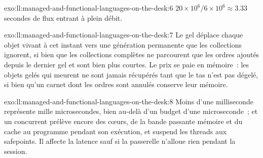 \begin{solution}{exo:ll:managed-and-functional-languages-on-the-desk:6}
$20 \times 10^6 / 6 \times 10^6 \approx 3.33$ secondes de flux entrant à plein débit.
\end{solution}

\begin{solution}{exo:ll:managed-and-functional-languages-on-the-desk:7}
Le gel déplace chaque objet vivant à cet instant vers une génération permanente que les collections ignorent, si bien que les collections complètes
ne parcourent que les ordres ajoutés depuis le dernier gel et sont bien plus courtes. Le prix se paie en mémoire~: les objets gelés qui meurent
ne sont jamais récupérés tant que le tas n'est pas dégelé, si bien qu'un carnet dont les ordres sont annulés conserve leur mémoire.
\end{solution}

\begin{solution}{exo:ll:managed-and-functional-languages-on-the-desk:8}
Moins d'une milliseconde représente mille microsecondes, bien au-delà d'un budget d'une microseconde~; et un  concurrent prélève encore
des cœurs, de la bande passante mémoire et du cache au programme pendant son exécution, et suspend les threads aux safepoints. Il affecte la latence
sauf si la passerelle n'alloue rien pendant la session.
\end{solution}

